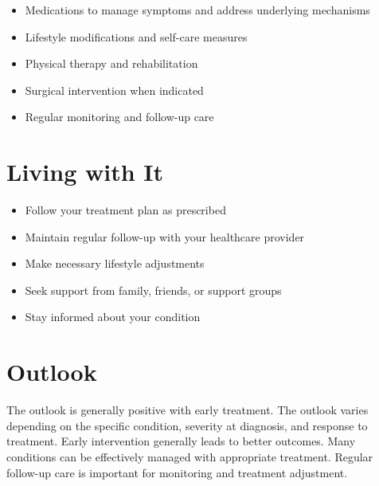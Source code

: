 \begin{itemize}[noitemsep]
  \item Medications to manage symptoms and address underlying mechanisms
  \item Lifestyle modifications and self-care measures
  \item Physical therapy and rehabilitation
  \item Surgical intervention when indicated
  \item Regular monitoring and follow-up care
\end{itemize}
\section{Living with It}
\begin{itemize}[noitemsep]
  \item Follow your treatment plan as prescribed
  \item Maintain regular follow-up with your healthcare provider
  \item Make necessary lifestyle adjustments
  \item Seek support from family, friends, or support groups
  \item Stay informed about your condition
\end{itemize}
\section{Outlook}
The outlook is generally positive with early treatment. The outlook varies depending on the specific condition, severity at diagnosis, and response to treatment. Early intervention generally leads to better outcomes. Many conditions can be effectively managed with appropriate treatment. Regular follow-up care is important for monitoring and treatment adjustment.
